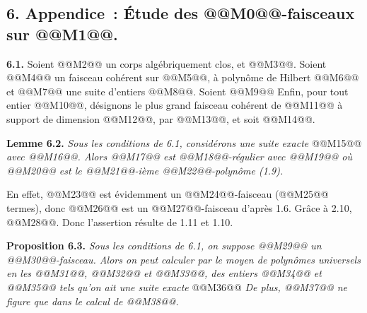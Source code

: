 
\subsection*{6. Appendice~: \'Etude des @@M0@@-faisceaux sur @@M1@@.}

\textbf{6.1.} Soient @@M2@@ un corps alg\'ebriquement clos, et @@M3@@. Soient @@M4@@ un faisceau coh\'erent sur @@M5@@, \`a polyn\^ome de Hilbert
@@M6@@
et
@@M7@@
une suite d'entiers @@M8@@. Soient
@@M9@@
Enfin, pour tout entier @@M10@@, d\'esignons le plus grand faisceau coh\'erent de @@M11@@ \`a support de dimension @@M12@@, par @@M13@@, et soit @@M14@@.

\textbf{Lemme 6.2.} \emph{Sous les conditions de 6.1, consid\'erons une suite exacte}
@@M15@@
\emph{avec @@M16@@. Alors @@M17@@ est @@M18@@-r\'egulier avec @@M19@@ o\`u @@M20@@ est le @@M21@@-i\`eme @@M22@@-polyn\^ome (1.9).}

En effet, @@M23@@ est \'evidemment un @@M24@@-faisceau (@@M25@@ termes), donc @@M26@@ est un @@M27@@-faisceau d'apr\`es 1.6. Gr\^ace \`a 2.10, @@M28@@. Donc l'assertion r\'esulte de 1.11 et 1.10.

\textbf{Proposition 6.3.} \emph{Sous les conditions de 6.1, on suppose @@M29@@ un @@M30@@-faisceau. Alors on peut calculer par le moyen de polyn\^omes universels en les @@M31@@, @@M32@@ et @@M33@@, des entiers @@M34@@ et @@M35@@ tels qu'on ait une suite exacte}
@@M36@@
\emph{De plus, @@M37@@ ne figure que dans le calcul de @@M38@@.}

